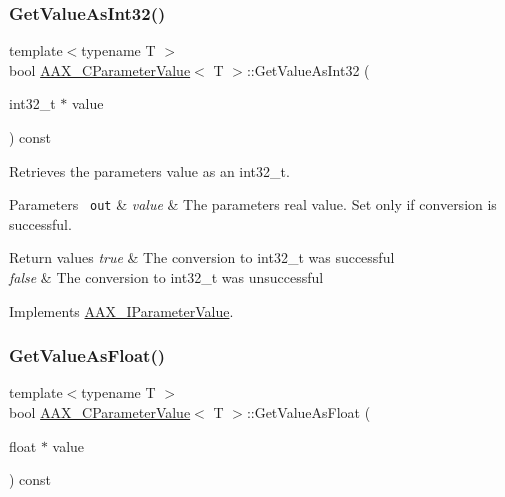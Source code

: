 \mbox{\label{a01533_a0688f74f24ea0b022b89e188c7e253da}} 
\subsubsection{\texorpdfstring{GetValueAsInt32()}{GetValueAsInt32()}\hspace{0.1cm}{\footnotesize\ttfamily [1/2]}}
{\footnotesize\ttfamily template$<$typename T $>$ \\
bool \mbox{\hyperlink{a01533}{A\+A\+X\+\_\+\+C\+Parameter\+Value}}$<$ T $>$\+::Get\+Value\+As\+Int32 (\begin{DoxyParamCaption}\item[{int32\+\_\+t $\ast$}]{value }\end{DoxyParamCaption}) const\hspace{0.3cm}{\ttfamily [virtual]}}



Retrieves the parameter\textquotesingle{}s value as an int32\+\_\+t. 


\begin{DoxyParams}[1]{Parameters}
\mbox{\texttt{ out}}  & {\em value} & The parameter\textquotesingle{}s real value. Set only if conversion is successful.\\
\hline
\end{DoxyParams}

\begin{DoxyRetVals}{Return values}
{\em true} & The conversion to int32\+\_\+t was successful \\
\hline
{\em false} & The conversion to int32\+\_\+t was unsuccessful \\
\hline
\end{DoxyRetVals}


Implements \mbox{\hyperlink{a01853_a94ff37ade5306ff8832a9848007c6397}{A\+A\+X\+\_\+\+I\+Parameter\+Value}}.

\mbox{\label{a01533_ac3301a3dc20e65906caa5610897a2a1a}} 
\subsubsection{\texorpdfstring{GetValueAsFloat()}{GetValueAsFloat()}\hspace{0.1cm}{\footnotesize\ttfamily [1/2]}}
{\footnotesize\ttfamily template$<$typename T $>$ \\
bool \mbox{\hyperlink{a01533}{A\+A\+X\+\_\+\+C\+Parameter\+Value}}$<$ T $>$\+::Get\+Value\+As\+Float (\begin{DoxyParamCaption}\item[{float $\ast$}]{value }\end{DoxyParamCaption}) const\hspace{0.3cm}{\ttfamily [virtual]}}



